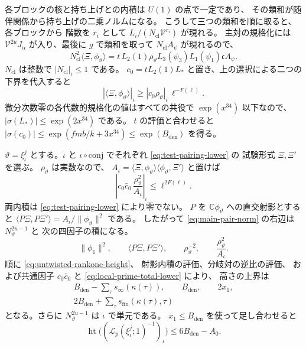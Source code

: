 各ブロックの核と持ち上げとの内積は \(U(1)\) の点で一定であり、
その類和が随伴関係から持ち上げの二乗ノルムになる。
こうして三つの類和を順に取ると、各ブロックから
階数を \(r_i\) として \(L_i/(N_\mathrm{cl}\mathcal V^{r_i})\) が現れる。
主対の規格化には \(\mathcal V^{2u}J_\alpha\) が入り、最後に \(g\) で類和を取って
\(N_\mathrm{cl} A_\psi\) が現れるので、
\begin{equation}\label{eq:attain-test-form-identity}
 N_\mathrm{cl}^2\langle\Xi,\phi_\vartheta\rangle
   =t\, L_2(1)\rho_\vartheta L_3(\psi_3)L_1(\psi_1)\mathfrak c A_\psi .
\end{equation}
\(N_\mathrm{cl}\) は整数で \(|N_\mathrm{cl}|_\iota\le1\) である。
\(c_0=t L_2(1)L_\ast\) と置き、上の選択による二つの下界を代入すると
\begin{equation}
 |\langle\Xi,\phi_\vartheta\rangle|_\iota
    \ge |c_0\rho_\vartheta|_\iota\,\ell^{-F(\ell)} .
 \label{eq:test-pairing-lower}
\end{equation}
微分次数零の各代数的規格化の値はすべての共役で
\(\exp(x^{34})\) 以下なので、\(|\sigma(L_\ast)|\le\exp(2x^{34})\) である。
\(t\) の評価と合わせると
\(|\sigma(c_0)|\le\exp(fmb/k+3x^{34})\le\exp(B_{\mathrm{den}})\) を得る。

\(\vartheta=\xi_\iota^j\) とする。\(\iota\) と
\(\iota\circ\mathrm{conj}\) でそれぞれ \eqref{eq:test-pairing-lower} の
試験形式 \(\Xi,\Xi'\) を選ぶ。 \(\rho_\vartheta\) は実数なので、
\(A_\iota=\langle\Xi,\phi_\vartheta\rangle\langle\phi_\vartheta,\Xi'\rangle\)
と置けば
\[
 \left| c_0\bar c_0\,\frac{\rho_\vartheta^2}{A_\iota}\right|_\iota
      \le \ell^{2 F(\ell)}.
\]
両内積は \eqref{eq:test-pairing-lower} により零でない。
\(P\) を \(\mathbb C\phi_\vartheta\) への直交射影とすると
\(\langle P\Xi,P\Xi'\rangle=A_\iota/\|\phi_\vartheta\|^2\) である。
したがって \eqref{eq:main-pair-norm} の右辺は \(N_\vartheta^{2u-1}\) と
次の四因子の積になる。
\[
 \|\phi_1\|^2,\qquad
 \langle P\Xi,P\Xi'\rangle,\qquad
 \rho_\vartheta^{-2},\qquad
 \frac{\rho_\vartheta^2}{A_\iota}.
\]
順に \eqref{eq:untwisted-rankone-height}、
射影内積の評価、分岐対の逆比の評価、
および共通因子 \(c_0\bar c_0\) と \eqref{eq:local-prime-total-lower} により、
高さの上界は
\[
 \begin{gathered}
 B_{\mathrm{den}}-\sum_\tau s_\infty(\kappa(\tau)),\qquad
 B_{\mathrm{den}},\qquad 2x_1,\\
 2B_{\mathrm{den}}+\sum_\tau s_{\mathrm{fin}}(\kappa(\tau),\tau)
 \end{gathered}
\]
となる。さらに \(N_\vartheta^{2u-1}\) は \(\iota\) で単元である。
\(x_1\le B_{\mathrm{den}}\) を使って足し合わせると
\begin{equation}
 \operatorname{ht}\bigl(
   (\mathcal L_p(\xi_\iota^j;1)^{-1})_\iota\bigr)
 \le 6 B_{\mathrm{den}}-A_0.
 \label{eq:main-pair-height-lower}
\end{equation}

